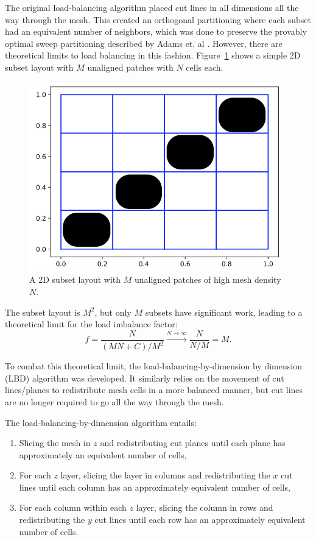 \documentclass[times,final]{elsarticle}
\begin{document}
The original load-balancing algorithm placed cut lines in all dimensions all the way through the mesh.
This created an orthogonal partitioning where each subset had an equivalent number of neighbors, which was done to preserve the provably optimal sweep partitioning described by Adams et. al \cite{mpadams2013,mpadams2015,mpadamsjcp}.
However, there are theoretical limits to load balancing in this fashion. Figure~\ref{2dgeneral} shows a simple 2D subset layout with $M$ unaligned patches with $N$ cells each.

\begin{figure}[H]
\centering
\includegraphics[scale=0.3]{../figures/theoretical_plot.png}
 \caption{A 2D subset layout with $M$ unaligned patches of high mesh density $N$.}
\label{2dgeneral}
\end{figure}
The subset layout is $M^2$, but only $M$ subsets have significant work, leading to a theoretical limit for the load imbalance factor:
\begin{equation}
f= \frac{N}{(MN+C)/M^2} \xrightarrow{N\to \infty} \frac{N}{N/M} = M.
\end{equation}

To combat this theoretical limit, the load-balancing-by-dimension by dimension (LBD) algorithm was developed. It similarly relies on the movement of cut lines/planes to redistribute mesh cells in a more balanced manner, but cut lines are no longer required to go all the way through the mesh.

The load-balancing-by-dimension algorithm entails:
\begin{enumerate}
  \item Slicing the mesh in $z$ and redistributing cut planes until each plane has approximately an equivalent number of cells,
  \item For each $z$ layer, slicing the layer in columns and redistributing the $x$ cut lines until each column has an approximately equivalent number of cells,
  \item For each column within each $z$ layer, slicing the column in rows and redistributing the $y$ cut lines until each row has an approximately equivalent number of cells.
\end{enumerate}
\end{document}
